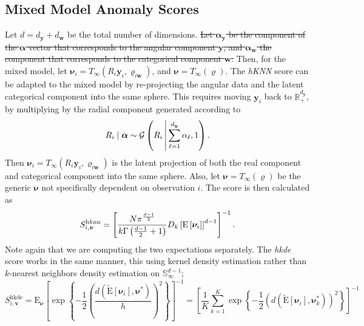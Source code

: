 \subsection{Mixed Model Anomaly Scores\label{sec:mixedscores}}
Let $d = d_{\bm{y}} + d_{\bm{w}}$ be the total number of dimensions.  \st{Let 
    $\bm{\alpha}_{\bm{y}}$ be the component of the $\bm{\alpha}$ vector that 
    corresponds  to the angular component $\bm{y}$, and $\bm{\alpha}_{\bm{w}}$ 
    the component that corresponds to the categorical component $\bm{w}$.}
    Then, for the mixed model, let 
    $\bm{\nu}_i = T_{\infty}(R_i\bm{y}_i, \bm{\varrho}_{i\bm{w}})$, and 
    $\bm{\nu} = T_{\infty}(\bm{\varrho})$.  The \emph{hKNN} score can be adapted 
    to the mixed model by re-projecting the angular data and the latent 
    categorical component into the same sphere. This requires moving $\bm{y}_i$ 
    back to $\mathbb{R}_+^{d_{\bm{y}}}$, by multiplying by the radial component
    generated according to
    \begin{equation}
        \label{eqn:angularradial}
        R_i\mid\bm{\alpha} \sim \mathcal{G}
        \left(R_i\,\middle\vert\,\sum_{\ell = 1}^{d_{\bm{y}}}\alpha_{\ell}, 1\right).
    \end{equation}
    Then $\bm{\nu}_i = T_{\infty}(R_i\bm{y}_i, \bm{\varrho}_{i\bm{w}})$ is the 
    latent projection of both the real component and categorical component into 
    the same sphere.   Also, let $\bm{\nu} = T_{\infty}(\bm{\varrho})$ be the 
    generic $\bm{\nu}$ not specifically dependent on observation $i$.  The 
    score is then calculated as
    \[
        S_{i,\bm{v}}^{\text{h$k$nn}} = \left[\frac{N\pi^{\frac{d-1}{2}}}{
                k\Gamma\left(\frac{d-1}{2} + 1\right)}
        D_{k}\left[\text{E}\left[\bm{\nu}_i\right]\right]^{d-1}\right]^{-1}.
    \]
    Note again that we are computing the two expectations separately.  The 
    \emph{hkde} score works in the same manner, this using kernel density 
    estimation rather than $k$-nearest neighbors density estimation on 
    $\mathbb{S}_{\infty}^{d-1}$;
    \begin{equation}
        \label{eqn:adhkdecat}
        S_{i,\bm{v}}^{\text{hkde}} = \text{E}_{\bm{\nu}}\left[\exp\left\lbrace -\frac{1}{2}
            \left(
            \frac{d\left(\tilde{\text{E}}[{\bm{\nu}_i}], \bm{\nu}^*\right)}{h}
            \right)^2\right\rbrace
            \right]^{-1}
            = 
            \left[\frac{1}{K}\sum_{k = 1}^K\exp\left\lbrace
            -\frac{1}{2}
            \left(
            d(\tilde{\text{E}}[\bm{\nu}_i], \bm{\nu}_k^*)
            \right)^2
            \right\rbrace
            \right]^{-1}
    \end{equation}
